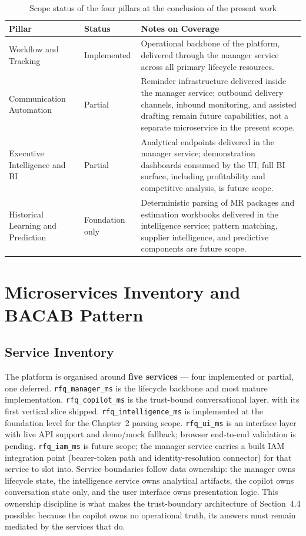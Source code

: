 \begin{table}[H]
\centering
\renewcommand{\arraystretch}{1.4}
\begin{tabularx}{\textwidth}{|p{3.5cm}|p{2.3cm}|>{\RaggedRight\arraybackslash}X|}
\hline
\rowcolor{lightgray}
\textbf{Pillar} & \textbf{Status} & \textbf{Notes on Coverage} \\ \hline
Workflow and Tracking & Implemented & Operational backbone of the platform, delivered through the manager service across all primary lifecycle resources. \\ \hline
Communication Automation & Partial & Reminder infrastructure delivered inside the manager service; outbound delivery channels, inbound monitoring, and assisted drafting remain future capabilities, not a separate microservice in the present scope. \\ \hline
Executive Intelligence and BI & Partial & Analytical endpoints delivered in the manager service; demonstration dashboards consumed by the UI; full BI surface, including profitability and competitive analysis, is future scope. \\ \hline
Historical Learning and Prediction & Foundation only & Deterministic parsing of MR packages and estimation workbooks delivered in the intelligence service; pattern matching, supplier intelligence, and predictive components are future scope. \\ \hline
\end{tabularx}
\caption{Scope status of the four pillars at the conclusion of the present work}
\label{tab:pillar_scope}
\end{table}

\section{Microservices Inventory and BACAB Pattern}
\subsection{Service Inventory}
The platform is organised around \textbf{five services} --- four implemented or partial, one deferred. \texttt{rfq\_manager\_ms} is the lifecycle backbone and most mature implementation. \texttt{rfq\_copilot\_ms} is the trust-bound conversational layer, with its first vertical slice shipped. \texttt{rfq\_intelligence\_ms} is implemented at the foundation level for the Chapter~2 parsing scope. \texttt{rfq\_ui\_ms} is an interface layer with live API support and demo/mock fallback; browser end-to-end validation is pending. \texttt{rfq\_iam\_ms} is future scope; the manager service carries a built IAM integration point (bearer-token path and identity-resolution connector) for that service to slot into. Service boundaries follow data ownership: the manager owns lifecycle state, the intelligence service owns analytical artifacts, the copilot owns conversation state only, and the user interface owns presentation logic. This ownership discipline is what makes the trust-boundary architecture of Section~4.4 possible: because the copilot owns no operational truth, its answers must remain mediated by the services that do.


